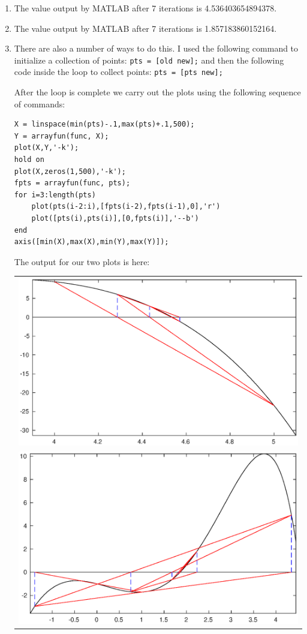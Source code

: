 \documentclass[12pt]{amsart}
\begin{document}
\begin{enumerate}
\begin{enumerate}
\vspace{3mm}

\item The value output by MATLAB after 7 iterations is
4.536403654894378.

\vspace{3mm}

\item  The value output by MATLAB after 7 iterations is 
1.857183860152164.
\vspace{3mm}

\item There are also a number of ways to do this. I used
the following command to initialize a collection of points:
{\tt pts = [old new];} and then the following code inside the 
loop to collect points: {\tt pts = [pts new];}

After the loop is complete we carry out the plots using the
following sequence of commands:

\begin{verbatim}
X = linspace(min(pts)-.1,max(pts)+.1,500);
Y = arrayfun(func, X);
plot(X,Y,'-k');
hold on
plot(X,zeros(1,500),'-k');
fpts = arrayfun(func, pts);
for i=3:length(pts)
    plot(pts(i-2:i),[fpts(i-2),fpts(i-1),0],'r')
    plot([pts(i),pts(i)],[0,fpts(i)],'--b')
end
axis([min(X),max(X),min(Y),max(Y)]);
\end{verbatim}

\vspace{5mm}

The output for our two plots is here:

\begin{tabular}{c}
\includegraphics[width=.8\textwidth]{hw3fig3.eps} \\
\includegraphics[width=.8\textwidth]{hw3fig2.eps} \end{tabular}
\end{enumerate}


\end{enumerate}
\end{document}
